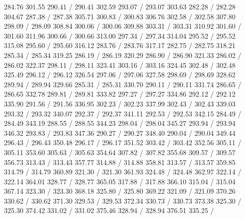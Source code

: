 { 284.76 301.55 290.41 /
 290.41 302.59 293.07 /
 293.07 303.63 282.28 /
 282.28 304.67 287.38 /
 287.38 305.71 300.83 /
 300.83 306.76 302.58 /
 302.58 307.80 298.09 /
 298.09 308.84 300.06 /
 300.06 309.88 303.31 /
 303.31 310.92 301.60 /
 301.60 311.96 300.66 /
 300.66 313.00 297.34 /
 297.34 314.04 295.52 /
 295.52 315.08 295.60 /
 295.60 316.12 283.76 /
 283.76 317.17 282.75 /
 282.75 318.21 285.34 /
 285.34 319.25 286.19 /
 286.19 320.29 286.90 /
 286.90 321.33 286.02 /
 286.02 322.37 298.11 /
 298.11 323.41 303.16 /
 303.16 324.45 302.48 /
 302.48 325.49 296.12 /
 296.12 326.54 297.06 /
 297.06 327.58 298.69 /
 298.69 328.62 289.94 /
 289.94 329.66 285.31 /
 285.31 330.70 290.11 /
 290.11 331.74 286.65 /
 286.65 332.78 289.81 /
 289.81 333.82 297.27 /
 297.27 334.86 292.12 /
 292.12 335.90 291.56 /
 291.56 336.95 302.23 /
 302.23 337.99 302.43 /
 302.43 339.03 293.32 /
 293.32 340.07 292.37 /
 292.37 341.11 292.53 /
 292.53 342.15 284.49 /
 284.49 343.19 288.55 /
 288.55 344.23 298.04 /
 298.04 345.27 293.94 /
 293.94 346.32 293.83 /
 293.83 347.36 290.27 /
 290.27 348.40 290.04 /
 290.04 349.44 296.43 /
 296.43 350.48 296.17 /
 296.17 351.52 303.42 /
 303.42 352.56 305.11 /
 305.11 353.60 305.63 /
 305.63 354.64 307.82 /
 307.82 355.68 309.57 /
 309.57 356.73 313.43 /
 313.43 357.77 314.88 /
 314.88 358.81 313.57 /
 313.57 359.85 314.79 /
 314.79 360.89 321.30 /
 321.30 361.93 324.48 /
 324.48 362.97 322.14 /
 322.14 364.01 328.77 /
 328.77 365.05 317.88 /
 317.88 366.10 315.04 /
 315.04 367.14 323.30 /
 323.30 368.18 325.80 /
 325.80 369.22 321.09 /
 321.09 370.26 330.62 /
 330.62 371.30 329.53 /
 329.53 372.34 330.73 /
 330.73 373.38 325.30 /
 325.30 374.42 331.02 /
 331.02 375.46 328.94 /
 328.94 376.51 335.25 /
}

